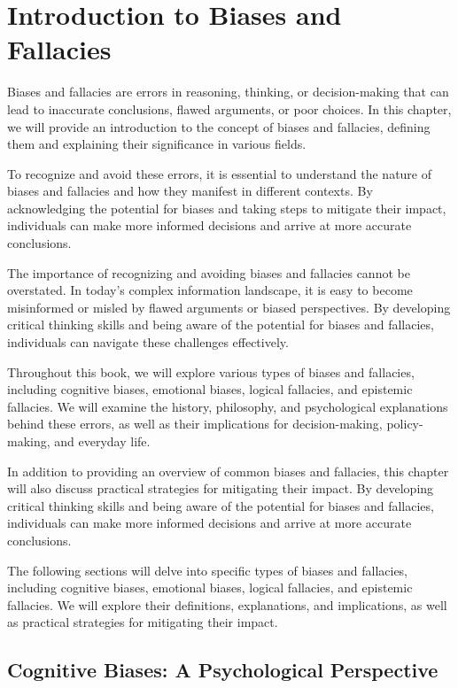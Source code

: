 \documentclass{report}%
\begin{document}
{{{{{{{{{{{%
\chapter{Introduction to Biases and Fallacies}

Biases and fallacies are errors in reasoning, thinking, or decision-making that can lead to inaccurate conclusions, flawed arguments, or poor choices. In this chapter, we will provide an introduction to the concept of biases and fallacies, defining them and explaining their significance in various fields.

To recognize and avoid these errors, it is essential to understand the nature of biases and fallacies and how they manifest in different contexts. By acknowledging the potential for biases and taking steps to mitigate their impact, individuals can make more informed decisions and arrive at more accurate conclusions.

The importance of recognizing and avoiding biases and fallacies cannot be overstated. In today's complex information landscape, it is easy to become misinformed or misled by flawed arguments or biased perspectives. By developing critical thinking skills and being aware of the potential for biases and fallacies, individuals can navigate these challenges effectively.

Throughout this book, we will explore various types of biases and fallacies, including cognitive biases, emotional biases, logical fallacies, and epistemic fallacies. We will examine the history, philosophy, and psychological explanations behind these errors, as well as their implications for decision-making, policy-making, and everyday life.

In addition to providing an overview of common biases and fallacies, this chapter will also discuss practical strategies for mitigating their impact. By developing critical thinking skills and being aware of the potential for biases and fallacies, individuals can make more informed decisions and arrive at more accurate conclusions.

The following sections will delve into specific types of biases and fallacies, including cognitive biases, emotional biases, logical fallacies, and epistemic fallacies. We will explore their definitions, explanations, and implications, as well as practical strategies for mitigating their impact.

\section{Cognitive Biases: A Psychological Perspective}

}}}}}}}}}}}
\end{document}
